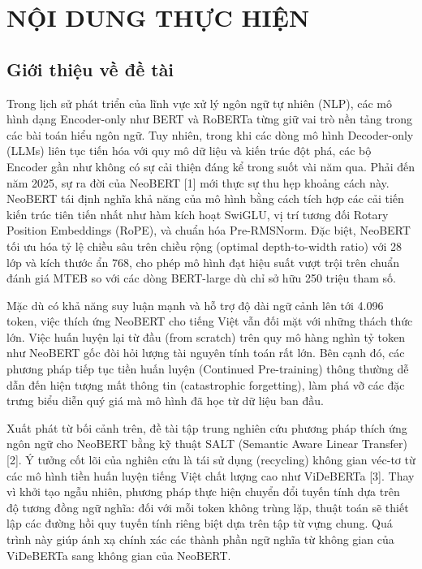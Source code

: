 \documentclass{article}[14pt]
\begin{document}
    \section{NỘI DUNG THỰC HIỆN}
    {

    
    \subsection{Giới thiệu về đề tài}
    
    Trong lịch sử phát triển của lĩnh vực xử lý ngôn ngữ tự nhiên (NLP), các mô hình dạng Encoder-only như BERT và RoBERTa từng giữ vai trò nền tảng trong các bài toán hiểu ngôn ngữ. Tuy nhiên, trong khi các dòng mô hình Decoder-only (LLMs) liên tục tiến hóa với quy mô dữ liệu và kiến trúc đột phá, các bộ Encoder gần như không có sự cải thiện đáng kể trong suốt vài năm qua. Phải đến năm 2025, sự ra đời của NeoBERT [1] mới thực sự thu hẹp khoảng cách này. NeoBERT tái định nghĩa khả năng của mô hình bằng cách tích hợp các cải tiến kiến trúc tiên tiến nhất như hàm kích hoạt SwiGLU, vị trí tương đối Rotary Position Embeddings (RoPE), và chuẩn hóa Pre-RMSNorm. Đặc biệt, NeoBERT tối ưu hóa tỷ lệ chiều sâu trên chiều rộng (optimal depth-to-width ratio) với 28 lớp và kích thước ẩn 768, cho phép mô hình đạt hiệu suất vượt trội trên chuẩn đánh giá MTEB so với các dòng BERT-large dù chỉ sở hữu 250 triệu tham số.
    
    Mặc dù có khả năng suy luận mạnh và hỗ trợ độ dài ngữ cảnh lên tới 4.096 token, việc thích ứng NeoBERT cho tiếng Việt vẫn đối mặt với những thách thức lớn. Việc huấn luyện lại từ đầu (from scratch) trên quy mô hàng nghìn tỷ token như NeoBERT gốc đòi hỏi lượng tài nguyên tính toán rất lớn. Bên cạnh đó, các phương pháp tiếp tục tiền huấn luyện (Continued Pre-training) thông thường dễ dẫn đến hiện tượng mất thông tin (catastrophic forgetting), làm phá vỡ các đặc trưng biểu diễn quý giá mà mô hình đã học từ dữ liệu ban đầu.
    
    Xuất phát từ bối cảnh trên, đề tài tập trung nghiên cứu phương pháp thích ứng ngôn ngữ cho NeoBERT bằng kỹ thuật SALT (Semantic Aware Linear Transfer) [2]. Ý tưởng cốt lõi của nghiên cứu là tái sử dụng (recycling) không gian véc-tơ từ các mô hình tiền huấn luyện tiếng Việt chất lượng cao như ViDeBERTa [3]. Thay vì khởi tạo ngẫu nhiên, phương pháp thực hiện chuyển đổi tuyến tính dựa trên độ tương đồng ngữ nghĩa: đối với mỗi token không trùng lặp, thuật toán sẽ thiết lập các đường hồi quy tuyến tính riêng biệt dựa trên tập từ vựng chung. Quá trình này giúp ánh xạ chính xác các thành phần ngữ nghĩa từ không gian của ViDeBERTa sang không gian của NeoBERT.
    
}
\end{document}
